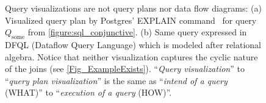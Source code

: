 \documentclass[letterpaper,11pt]{article}
\begin{document}
\begin{figure}[tb]
    \centering
	\hfill
    \caption{
	Query visualizations are not query plans nor data flow diagrams:
	(a) Visualized query plan by Postgres' EXPLAIN command~\cite{postgres} for query $Q_{\textrm{some}}$ from \autoref{figure:sql_conjunctive}.
	(b) Same query expressed in DFQL (Dataflow Query Language) \cite{DBLP:journals/iam/ClarkW94} which is modeled after relational algebra.
	Notice that neither visualization captures the cyclic nature of the joins 
	(see \autoref{Fig_ExampleExists}).
	``\emph{Query visualization}'' to ``\emph{query plan visualization}'' 
	is the same as
	``\emph{intend of a query} (WHAT)'' to ``\emph{execution of a query} (HOW)''.
		} 
    \label{Fig_explain_PersonBarBeer}
\end{figure}
\end{document}
